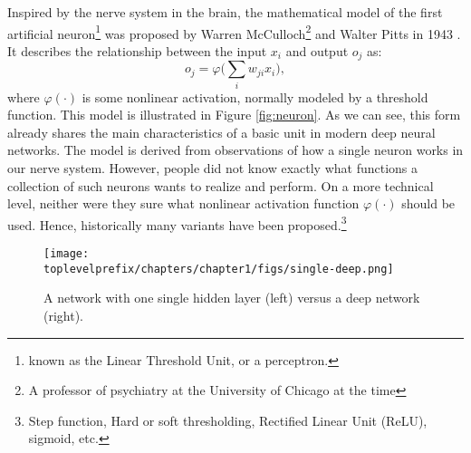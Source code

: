 \documentclass[../../book-main.tex]{subfiles}
\begin{document}
Inspired by the nerve system in the brain, the mathematical model of the first artificial neuron\footnote{known as the  Linear Threshold Unit, or a perceptron.} was proposed by Warren McCulloch\footnote{A professor of psychiatry at the University of Chicago at the time} and Walter Pitts in 1943 \cite{McCulloch-Pitts}. It describes the relationship between the input $x_i$ and output $o_j$ as:
\begin{equation}
    o_j = \varphi\Big( \sum_i w_{ji}x_i\Big),  
\end{equation}
where $\varphi(\cdot)$ is some nonlinear activation, normally modeled by a threshold function. This model is illustrated in Figure \ref{fig:neuron}. As we can see, this form already shares the main characteristics of a basic unit in modern deep neural networks. The model is derived from observations of how a single neuron works in our nerve system. However, people did not know exactly what functions a collection of such neurons wants to realize and perform. On a more technical level, neither were they sure what nonlinear activation function $\varphi(\cdot)$ should be used. Hence, historically many variants have been proposed.\footnote{Step function, Hard or soft thresholding, Rectified Linear Unit (ReLU), sigmoid, etc.
}

\begin{figure}[t]
\centering
\texttt{[image: \\toplevelprefix/chapters/chapter1/figs/single-deep.png]}
    \caption{A network with one single hidden layer (left) versus a deep network (right).  }
    \label{fig:single-deep}
\end{figure}
\end{document}
